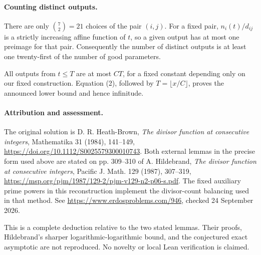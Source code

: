 \paragraph{Counting distinct outputs.}
There are only \(\binom72=21\) choices of the pair \((i,j)\). For a fixed pair, \(n_i(t)/d_{ij}\) is a strictly increasing affine function of \(t\), so a given output has at most one preimage for that pair. Consequently the number of distinct outputs is at least one twenty-first of the number of good parameters.

All outputs from \(t\leq T\) are at most \(CT\), for a fixed constant depending only on our fixed construction. Equation (2), followed by \(T=\lfloor x/C\rfloor\), proves the announced lower bound and hence infinitude.

\paragraph{Attribution and assessment.}
The original solution is D. R. Heath-Brown, \emph{The divisor function at consecutive integers}, Mathematika 31 (1984), 141--149, \url{https://doi.org/10.1112/S0025579300010743}. Both external lemmas in the precise form used above are stated on pp. 309--310 of A. Hildebrand, \emph{The divisor function at consecutive integers}, Pacific J. Math. 129 (1987), 307--319, \url{https://msp.org/pjm/1987/129-2/pjm-v129-n2-p06-s.pdf}. The fixed auxiliary prime powers in this reconstruction implement the divisor-count balancing used in that method. See \url{https://www.erdosproblems.com/946}, checked 24 September 2026.

This is a complete deduction relative to the two stated lemmas. Their proofs, Hildebrand's sharper logarithmic-logarithmic bound, and the conjectured exact asymptotic are not reproduced. No novelty or local Lean verification is claimed.
